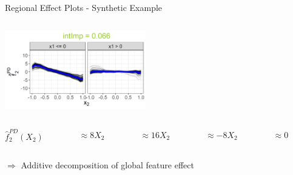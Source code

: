 \documentclass[11pt,compress,t,notes=noshow, aspectratio=169, xcolor=table,dvipsnames]{beamer}
\begin{document}
\begin{frame}{Regional Effect Plots - Synthetic Example}
\begin{columns}[T, totalwidth = \linewidth]
\begin{column}{0.55\textwidth}
{{    \includegraphics[width=0.46\textwidth, trim = 40 0 0 25, clip]{figure/sim1_dt_split2_2.png}
    }

     \begin{columns}[T, totalwidth = \linewidth]
            \begin{column}{0.1\linewidth}
            \centering
             $\hat{f}_2^{PD}(X_2)$ %
         \end{column}
         \begin{column}{0.18\linewidth}
         \centering
             $\approx 8X_2$ %
         \end{column}
        \begin{column}{0.2\linewidth}
\centering
            $\approx 16X_2$ %
         \end{column}
        \begin{column}{0.2\linewidth}
        \centering
            $ \approx -8X_2$ %
         \end{column}        
         \begin{column}{0.2\linewidth}
         \centering
             $\approx 0$%
         \end{column}
     \end{columns}
     \medskip
     $\Rightarrow$ Additive decomposition of global feature effect
}


    \end{column}


\end{columns}
\end{frame}
\end{document}
